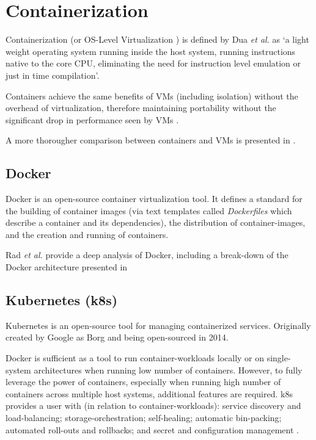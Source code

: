 \section{Containerization}

Containerization (or OS-Level Virtualization \cite{10.5555/1571423}) is defined by Dua \emph{et al.} as 
`a light weight operating system running inside the host system, running instructions native to the core
CPU, eliminating the need for instruction level emulation or just in time compilation'\cite{6903537}.

Containers achieve the same benefits of VMs (including isolation) without the overhead of virtualization, therefore maintaining portability 
without the significant drop in performance seen by VMs \cite{POTDAR20201419}.

A more thorougher comparison between containers and VMs is presented in \cite[Table 1]{6903537}.

\subsection{Docker}
Docker \cite{docker} is an open-source container virtualization tool. 
It defines a standard for the building of container images (via text templates called \textit{Dockerfiles} which describe a container and its dependencies),
the distribution of container-images, and the creation and running of containers\cite{7093032}.

Rad \emph{et al.} \cite{rad2017introduction} provide a deep analysis of Docker, including a break-down of the Docker architecture presented in \cite[Fig. 1]{rad2017introduction}

\subsection{Kubernetes (k8s)}
Kubernetes \cite{kubernetes} is an open-source tool for managing containerized services. 
Originally created by Google as Borg \cite{10.1145/2741948.2741964} and being open-sourced in 2014\cite{metz_2014}. 

Docker is sufficient as a tool to run container-workloads locally or on single-system architectures when running low number of containers.
However, to fully leverage the power of containers, especially when running high number of containers across multiple host systems, additional features are required.
k8s provides a user with (in relation to container-workloads): service discovery and load-balancing; storage-orchestration; self-healing; automatic bin-packing; automated roll-outs and rollbacks; 
and secret and configuration management \cite{kubernetes_2022}.

